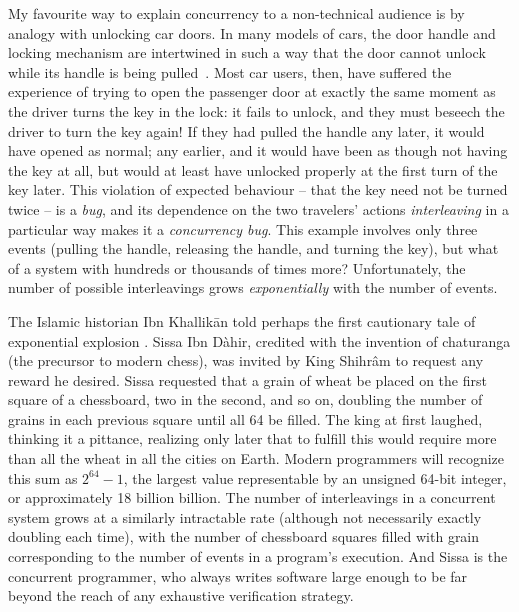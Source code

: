 {My favourite way to explain concurrency to a non-technical audience
is by analogy with unlocking car doors.
In many %
models of cars, the door handle and locking mechanism are intertwined
in such a way that the door cannot unlock while its handle is being pulled~\cite{car-doors}.
Most car users, then,
have suffered the experience of
trying to open the passenger door
at exactly the same moment as the driver turns the key in the lock:
it fails to unlock, and
they must beseech the driver to turn the key again!
If they had pulled the handle any later, it would have opened as normal;
any earlier, and it would have been as though not having the key at all,
but would at least have unlocked properly at the first turn of the key later.
This violation of expected behaviour -- that the key need not be turned twice --
is a {\em bug},
and its dependence on the two travelers' actions {\em interleaving}
in a particular way
makes it a {\em concurrency bug}.
This example involves only three events (pulling the handle, releasing the handle, and turning the key),
but what of a system with hundreds or thousands of times more?
Unfortunately, the number of possible interleavings grows {\em exponentially} with the number of events.

The Islamic historian Ibn Khallik\={a}n told perhaps the first cautionary tale of exponential explosion
\cite{ibn-khallikan,khallikān1868ibn}.
Sissa Ibn D\`{a}hir,
credited with the invention of chaturanga (the precursor to modern chess),
was invited by King Shihr\^{a}m to request any reward he desired.
Sissa requested that a grain of wheat be placed on the first square of a chessboard,
two in the second, and so on, doubling the number of grains in each previous square until all 64 be filled.
The king at first laughed, thinking it a pittance,
realizing only later that to fulfill this would require
more than all the wheat in all the cities on Earth.
Modern programmers will recognize this sum as $2^{64}-1$,
the largest value representable by an unsigned 64-bit integer,
or approximately 18 billion billion.
The number of interleavings in a concurrent system grows at a similarly intractable rate
(although not necessarily exactly doubling each time),
with the number of chessboard squares filled with grain corresponding to the number of events in a program's execution.
And Sissa is the concurrent programmer,
who always writes software large enough to be far beyond the reach of any exhaustive verification strategy.
}

